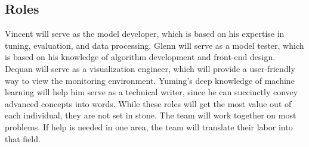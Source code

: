 \documentclass[
	letterpaper, %
	12pt, %
]{CSUniSchoolLabReport}
\begin{document}
\subsection{Roles}
Vincent will serve as the model developer, which is based on his expertise in tuning, evaluation, and data processing. Glenn will serve as a model tester, which is based on his knowledge of algorithm development and front-end design. Dequan will serve as a visualization engineer, which will provide a user-friendly way to view the monitoring environment. Yuming’s deep knowledge of machine learning will help him serve as a technical writer, since he can succinctly convey advanced concepts into words. While these roles will get the most value out of each individual, they are not set in stone. The team will work together on most problems. If help is needed in one area, the team will translate their labor into that field.
\end{document}
